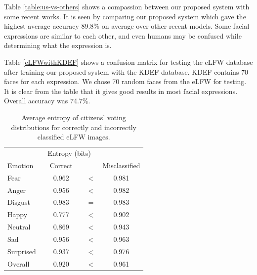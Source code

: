     




%










%
%
Table \ref{table:us-vs-others} shows a compassion between our proposed system with some recent works. It is seen by comparing our proposed system which gave the highest average accuracy 89.8\% on average over other recent models. Some facial expressions are similar to each other, and even humans may be confused while determining what the expression is. 


Table \ref{eLFWwithKDEF} shows a confusion matrix for testing the eLFW database after training our proposed system with the KDEF database. KDEF contains 70 faces for each expression. We chose 70 random faces from the eLFW for testing. It is clear from the table that it gives good results in most facial expressions. Overall accuracy was $74.7\%$.






  



%
%
\begin{table}[tb]
	\centering
	\caption{Average entropy of citizens' voting distributions for correctly and incorrectly classified eLFW images.}
	\label{Table:ClassificationEntopy}
	\begin{tabular}{lclc}
		\hline
		& \multicolumn{2}{c}{{Entropy (bits)}} \tabularnewline
		Emotion & \strut~~Correct~~\strut& & Misclassified \tabularnewline    \hline                                   
		{Fear}        & 0.962  &$<$ & 0.981     \tabularnewline 
		{Anger}       & 0.956  &$<$ & 0.982     \tabularnewline 
		{Disgust}     & 0.983  &$=$ & 0.983     \tabularnewline 
		{Happy}       & 0.777  &$<$ & 0.902     \tabularnewline 
		{Neutral}     & 0.869  &$<$ & 0.943     \tabularnewline 
		{Sad}         & 0.956  &$<$ & 0.963      \tabularnewline 
		{Surprised}   & 0.937  &$<$ & 0.976     \tabularnewline \hline 
		{Overall}    & {0.920}&$<$ & {0.961}  \tabularnewline \hline
	\end{tabular}
\end{table}
